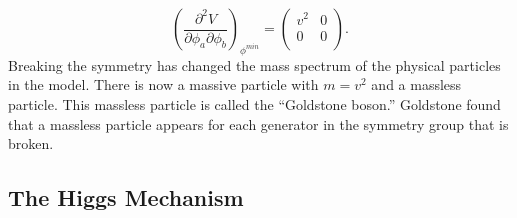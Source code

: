 \begin{equation}
  \left(\frac {\partial^2
  V}{\partial \phi_a \partial \phi_b}\right)_{\phi^{min}} = 
  \left(
  \begin{array}{cc}
    v^2 & 0 \\
    0 & 0 \\
  \end{array}
  \right).
  \nonumber
\end{equation}
Breaking the symmetry has changed the mass spectrum of the physical particles in
the model.  There is now a massive particle with $m=v^2$ and a massless
particle.  This massless particle is called the ``Goldstone boson.'' Goldstone
found~\cite{Goldstone:1961eq} that a massless particle appears for each
generator in the symmetry group that is broken.

\subsection{The Higgs Mechanism}
\label{sec:HiggsMech}

